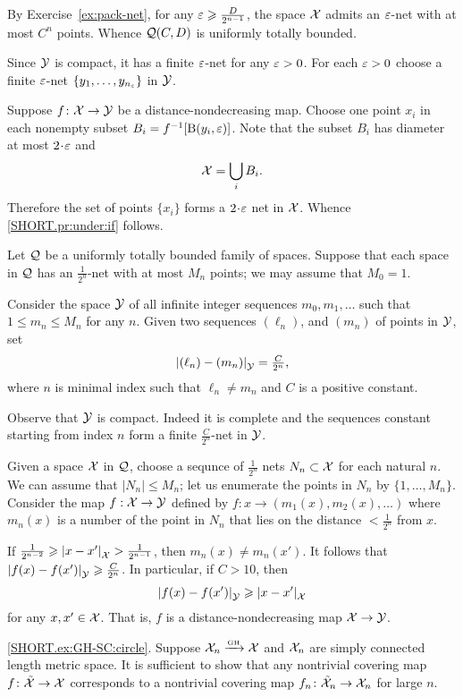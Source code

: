By Exercise~\ref{ex:pack-net}, for any $\varepsilon\geqslant\frac D{2^{n-1}}$, the space $\mathcal{X}$ admits an $\varepsilon$-net with at most $C^n$ points.
Whence $\mathcal{Q}(C,D)$ is uniformly totally bounded.

Since $\mathcal{Y}$ is compact, it has a finite $\varepsilon$-net for any $\varepsilon>0$.
For each $\varepsilon>0$ choose a finite $\varepsilon$-net $\{y_1,\dots,y_{n_\varepsilon}\}$ in $\mathcal{Y}$.

Suppose $f\colon\mathcal{X}\to \mathcal{Y}$ be a distance-nondecreasing map.
Choose one point $x_i$ in each nonempty subset $B_i=f^{-1}[\mathrm{B}{}(y_i,\varepsilon)]$.
Note that the subset $B_i$ has diameter at most $2\cdot \eps$ and 
\[\mathcal{X}=\bigcup_iB_i.\]
Therefore the set of points $\{x_i\}$ forms a $2\cdot\eps$ net in $\mathcal{X}$.
Whence \ref{SHORT.pr:under:if} follows.

 Let $\mathcal{Q}$ be a uniformly totally bounded family of spaces. 
Suppose that each space in $\mathcal{Q}$ has an $\tfrac1{2^n}$-net with at most $M_n$ points; we may assume that $M_0=1$.

Consider the space $\mathcal{Y}$ of all infinite integer sequences $m_0,m_1,\dots$ such that $1\le m_n\le M_n$ for any $n$.
Given two sequences $(\ell_n)$, and $(m_n)$ of points in $\mathcal{Y}$, set 
\[\dist{(\ell_n)}{(m_n)}{\spc{Y}}=\tfrac C{2^{n}},\]
where $n$ is minimal index such that $\ell_n\ne m_n$ and $C$ is a positive constant.

Observe that $\mathcal{Y}$ is compact.
Indeed it is complete and the sequences constant starting from index $n$ form a finite $\tfrac C{2^{n}}$-net in $\mathcal{Y}$.

Given a space $\mathcal{X}$ in $\mathcal{Q}$,
choose a sequnce of $\tfrac1{2^n}$ nets 
$N_n\subset\mathcal{X}$ for each natural $n$.
We can assume that $|N_n|\le M_n$; let us enumerate the points in $N_n$ by $\{1,\dots,M_n\}$.
Consider the map $f:\mathcal{X}\to\mathcal{Y}$ defined by $f:x\to (m_1(x),m_2(x),\dots)$ where $m_n(x)$ is a number of the point in $N_n$ that lies on the distance $<\tfrac1{2^n}$ from $x$.

If $\tfrac1{2^{n-2}}\ge \dist{x}{x'}{\spc{X}}>\tfrac1{2^{n-1}}$, then $m_n(x)\ne m_n(x')$.
It follows that $\dist{f(x)}{f(x')}{\spc{Y}}\ge \tfrac C{2^{n}}$.
In particular, if $C>10$, then 
\[\dist{f(x)}{f(x')}{\spc{Y}}\ge \dist{x}{x'}{\spc{X}}\]
for any $x,x'\in \mathcal{X}$.
That is, $f$ is a distance-nondecreasing map $\mathcal{X}\to \mathcal{Y}$.

 \ref{SHORT.ex:GH-SC:circle}.
Suppose $\mathcal{X}_n\xrightarrow{\mbox{\tiny\rm GH}} \mathcal{X}$ and $\mathcal{X}_n$ are simply connected length metric space.
It is sufficient to show that any nontrivial covering map $f\colon\tilde{\mathcal{X}}\to \mathcal{X}$ corresponds to a nontrivial covering map $f_n\colon\tilde{\mathcal{X}}_n\to \mathcal{X}_n$ for large $n$.

